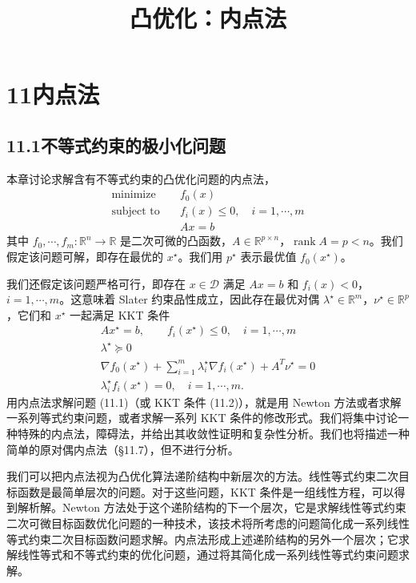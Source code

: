 \documentclass[UTF8,12pt,a4paper,fontset=fandol]{ctexart}
\title{凸优化：内点法}
\author{}
\date{}
\begin{document}
\maketitle

\section*{11\quad 内点法}

\subsection*{11.1\quad 不等式约束的极小化问题}

本章讨论求解含有不等式约束的凸优化问题的内点法，
\begin{equation}
\begin{aligned}
\text{minimize}\quad & f_0(x)\\
\text{subject to}\quad & f_i(x)\leq 0,\quad i=1,\cdots,m\\
& Ax=b
\end{aligned}
\tag{11.1}
\end{equation}
其中 $f_0,\cdots,f_m:\mathbb{R}^n\to\mathbb{R}$ 是二次可微的凸函数，$A\in\mathbb{R}^{p\times n}$，$\operatorname{rank}A=p<n$。我们假定该问题可解，即存在最优的 $x^\star$。我们用 $p^\star$ 表示最优值 $f_0(x^\star)$。

我们还假定该问题严格可行，即存在 $x\in\mathcal{D}$ 满足 $Ax=b$ 和 $f_i(x)<0$，$i=1,\cdots,m$。这意味着 Slater 约束品性成立，因此存在最优对偶 $\lambda^\star\in\mathbb{R}^m$，$\nu^\star\in\mathbb{R}^p$，它们和 $x^\star$ 一起满足 KKT 条件
\begin{equation}
\begin{gathered}
Ax^\star=b,\qquad f_i(x^\star)\leq 0,\quad i=1,\cdots,m\\
\lambda^\star\succeq 0\\
\nabla f_0(x^\star)+\sum_{i=1}^m\lambda_i^\star\nabla f_i(x^\star)+A^T\nu^\star=0\\
\lambda_i^\star f_i(x^\star)=0,\quad i=1,\cdots,m.
\end{gathered}
\tag{11.2}
\end{equation}
用内点法求解问题 (11.1)（或 KKT 条件 (11.2)），就是用 Newton 方法或者求解一系列等式约束问题，或者求解一系列 KKT 条件的修改形式。我们将集中讨论一种特殊的内点法，障碍法，并给出其收敛性证明和复杂性分析。我们也将描述一种简单的原对偶内点法（\S11.7），但不进行分析。

我们可以把内点法视为凸优化算法递阶结构中新层次的方法。线性等式约束二次目标函数是最简单层次的问题。对于这些问题，KKT 条件是一组线性方程，可以得到解析解。Newton 方法处于这个递阶结构的下一个层次，它是求解线性等式约束二次可微目标函数优化问题的一种技术，该技术将所考虑的问题简化成一系列线性等式约束二次目标函数问题求解。内点法形成上述递阶结构的另外一个层次；它求解线性等式和不等式约束的优化问题，通过将其简化成一系列线性等式约束问题求解。
\end{document}

